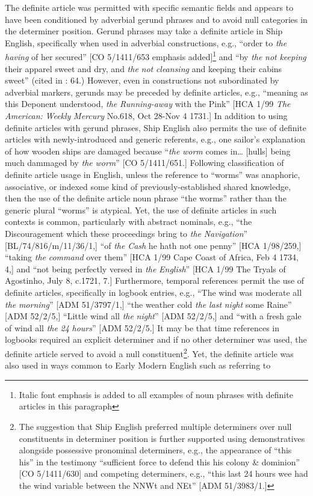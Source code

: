   The definite article was permitted with specific semantic fields and appears to have been conditioned by adverbial gerund phrases and to avoid null categories in the determiner position. Gerund phrases may take a definite article in Ship English, specifically when used in adverbial constructions, e.g., “order to \textit{the} \textit{having} of her secured” [CO 5/1411/653 emphasis added]\footnote{Italic font emphasis is added to all examples of noun phrases with definite articles in this paragraph} and “by \textit{the} \textit{not} \textit{keeping} their apparel sweet and dry, and \textit{the} \textit{not} \textit{cleansing} and keeping their cabins sweet” (cited in \citealt{Brown2011}: 64.) However, even in constructions not subordinated by adverbial markers, gerunds may be preceded by definite articles, e.g., “meaning as this Deponent understood, \textit{the} \textit{Running-away} with the Pink” [HCA 1/99 \textit{The} \textit{American:} \textit{Weekly} \textit{Mercury} No.618, Oct 28-Nov 4 1731.] In addition to using definite articles with gerund phrases, Ship English also permits the use of definite articles with newly-introduced and generic referents, e.g., one sailor’s explanation of how wooden ships are damaged because “\textit{the} \textit{worm} comes in… [hulls] being much dammaged by \textit{the} \textit{worm}” [CO 5/1411/651.] Following  classification of definite article usage in English, unless the reference to “worms” was anaphoric, associative, or indexed some kind of previously-established shared knowledge, then the use of the definite article noun phrase “the worms” rather than the generic plural “worms” is atypical. Yet, the use of definite articles in such contexts is common, particularly with abstract nominals, e.g., “the Discouragement which these proceedings bring to \textit{the} \textit{Navigation}” [BL/74/816/m/11/36/1,] “of \textit{the} \textit{Cash} he hath not one penny” [HCA 1/98/259,] “taking \textit{the} \textit{command} over them” [HCA 1/99 Cape Coast of Africa, Feb 4 1734, 4,] and “not being perfectly versed in \textit{the} \textit{English}” [HCA 1/99 The Tryals of Agostinho, July 8, c.1721, 7.] Furthermore, temporal references permit the use of definite articles, specifically in logbook entries, e.g., “The wind was moderate all \textit{the} \textit{morning}” [ADM 51/3797/1,] “the weather cold \textit{the} \textit{last} \textit{night} some Raine” [ADM 52/2/5,] “Little wind all \textit{the} \textit{night}” [ADM 52/2/5,] and “with a fresh gale of wind all \textit{the} \textit{24} \textit{hours}” [ADM 52/2/5.] It may be that time references in logbooks required an explicit determiner and if no other determiner was used, the definite article served to avoid a null constituent\footnote{The suggestion that Ship English preferred multiple determiners over null constituents in determiner position is further supported using demonstratives alongside possessive pronominal determiners, e.g., the appearance of “this his” in the testimony “sufficient force to defend this his colony \& dominion” [CO 5/1411/630] and competing determiners, e.g., “this last 24 hours wee had the wind variable between the NNWt and NEt” [ADM 51/3983/1.]}. Yet, the definite article was also used in ways common to Early Modern English such as referring to 